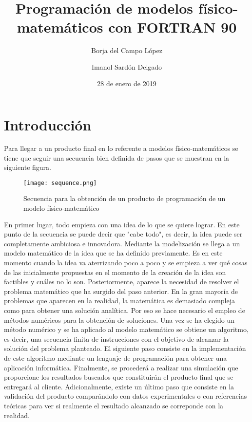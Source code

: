\documentclass{article}
\title{Programación de modelos físico-matemáticos con FORTRAN 90}
\author{Borja del Campo López \and Imanol Sardón Delgado}
\date{28 de enero de 2019}
\begin{document}
	
	\maketitle
	\thispagestyle{empty}
%	
	\newpage
	\tableofcontents
	\newpage
	
	\section{Introducción}
	
	Para llegar a un producto final en lo referente a modelos físico-matemáticos se tiene que seguir una secuencia bien definida de pasos que se muestran en la siguiente figura.
	
	\begin{figure}[h!]
		\begin{center}
			\texttt{[image: sequence.png]}
			\caption{Secuencia para la obtención de un producto de programación de un modelo físico-matemático}
		\end{center}
	\end{figure}

	En primer lugar, todo empieza con una idea de lo que se quiere lograr. En este punto de la secuencia se puede decir que "cabe todo", es decir, la idea puede ser completamente ambiciosa e innovadora. Mediante la modelización se llega a un modelo matemático de la idea que se ha definido previamente. Es en este momento cuando la idea va aterrizando poco a poco y se empieza a ver qué cosas de las inicialmente propuestas en el momento de la creación de la idea son factibles y cuáles no lo son. Posteriormente, aparece la necesidad de resolver el problema matemático que ha surgido del paso anterior. En la gran mayoría de problemas que aparecen en la realidad, la matemática es demasiado compleja como para obtener una solución analítica. Por eso se hace necesario el empleo de métodos numéricos para la obtención de soluciones. Una vez se ha elegido un método numérico y se ha aplicado al modelo matemático se obtiene un algoritmo, es decir, una secuencia finita de instrucciones con el objetivo de alcanzar la solución del problema planteado. El siguiente paso consiste en la implementación de este algoritmo mediante un lenguaje de programación para obtener una aplicación informática. Finalmente, se procederá a realizar una simulación que proporcione los resultados buscados que constituirán el producto final que se entregará al cliente. Adicionalmente, existe un último paso que consiste en la validación del producto comparándolo con datos experimentales o con referencias teóricas para ver si realmente el resultado alcanzado se correponde con la realidad.
	
\end{document}
